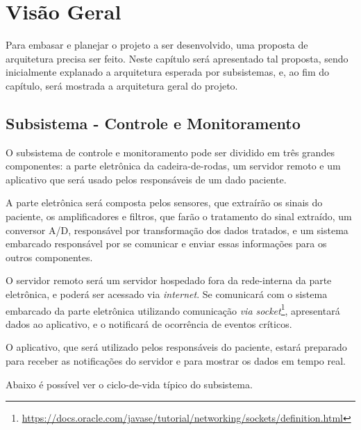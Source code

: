 \chapter{Visão Geral}

Para embasar e planejar o projeto a ser desenvolvido, uma proposta de
arquitetura precisa ser feito. Neste capítulo será apresentado tal proposta,
sendo inicialmente explanado a arquitetura esperada por subsistemas, e, ao fim
do capítulo, será mostrada a arquitetura geral do projeto.

\section{Subsistema - Controle e Monitoramento}

O subsistema de controle e monitoramento pode ser dividido em três grandes
componentes: a parte eletrônica da cadeira-de-rodas, um servidor remoto e um
aplicativo que será usado pelos responsáveis de um dado paciente.

A parte eletrônica será composta pelos sensores, que extraírão os sinais do
paciente, os amplificadores e filtros, que farão o tratamento do sinal
extraído, um conversor A/D, responsável por transformação dos dados tratados,
e um sistema embarcado responsável por se comunicar e enviar essas informações
para os outros componentes.

O servidor remoto será um servidor hospedado fora da rede-interna da parte
eletrônica, e poderá ser acessado via \textit{internet}. Se comunicará com
o sistema embarcado da parte eletrônica utilizando comunicação
\textit{via socket}\footnote{\url{https://docs.oracle.com/javase/tutorial/networking/sockets/definition.html}},
apresentará dados ao aplicativo, e o notificará de ocorrência de eventos
críticos.

O aplicativo, que será utilizado pelos responsáveis do paciente, estará
preparado para receber as notificações do servidor e para mostrar os dados em
tempo real.

Abaixo é possível ver o ciclo-de-vida típico do subsistema.

